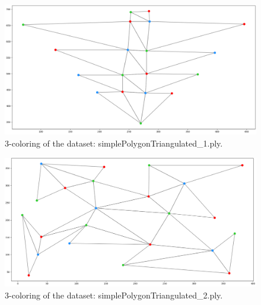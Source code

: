 \documentclass[english, fontsize=12pt, paper=a4, twoside=false, draft=true, pagesize=auto, version=last, DIV=16]{scrartcl}
\theoremstyle{break}
\begin{document}
\begin{figure}[h!]
\centering
\includegraphics[width=\textwidth]{images/Figure_1.png}
\caption{3-coloring of the dataset: simplePolygonTriangulated\_1.ply.}
\end{figure}
\vspace*{15mm}

\begin{figure}[h!]
\centering
\includegraphics[width=\textwidth]{images/Figure_2.png}
\caption{3-coloring of the dataset: simplePolygonTriangulated\_2.ply.}
\end{figure}



% 
% 

\printbibliography
%
\end{document}
